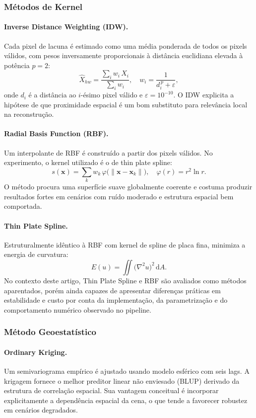 \subsubsection{Métodos de Kernel}

\paragraph{Inverse Distance Weighting (IDW).}
Cada pixel de lacuna é estimado como uma média ponderada de todos os pixels válidos, com pesos inversamente proporcionais à distância euclidiana elevada à potência $p{=}2$:
\[
  \hat{X}_{hw} = \frac{\sum_i w_i \, X_i}{\sum_i w_i},
  \quad
  w_i = \frac{1}{d_i^{\,p} + \varepsilon},
\]
onde $d_i$ é a distância ao $i$-ésimo pixel válido e $\varepsilon = 10^{-10}$.
O \gls{IDW} explicita a hipótese de que proximidade espacial é um bom substituto para relevância local na reconstrução.

\paragraph{Radial Basis Function (RBF).}
Um interpolante de \gls{RBF} é construído a partir dos pixels válidos. No experimento, o kernel utilizado é o de thin plate spline:
\[
  s(\mathbf{x})
  = \sum_k w_k \, \varphi\!\bigl(\|\mathbf{x} - \mathbf{x}_k\|\bigr),
  \quad
  \varphi(r) = r^2 \ln r.
\]
O método procura uma superfície suave globalmente coerente e costuma produzir resultados fortes em cenários com ruído moderado e estrutura espacial bem comportada.

\paragraph{Thin Plate Spline.}
Estruturalmente idêntico à \gls{RBF} com kernel de spline de placa fina, minimiza a energia de curvatura:
\[
  E(u) = \iint \bigl(\nabla^2 u\bigr)^2 \, \mathrm{d}A.
\]
No contexto deste artigo, Thin Plate Spline e RBF são avaliados como métodos aparentados, porém ainda capazes de apresentar diferenças práticas em estabilidade e custo por conta da implementação, da parametrização e do comportamento numérico observado no pipeline.

\subsubsection{Método Geoestatístico}

\paragraph{Ordinary Kriging.}
Um semivariograma empírico é ajustado usando modelo esférico com seis lags.
A krigagem fornece o melhor preditor linear não enviesado (\gls{BLUP}) derivado da estrutura de correlação espacial.
Sua vantagem conceitual é incorporar explicitamente a dependência espacial da cena, o que tende a favorecer robustez em cenários degradados.

